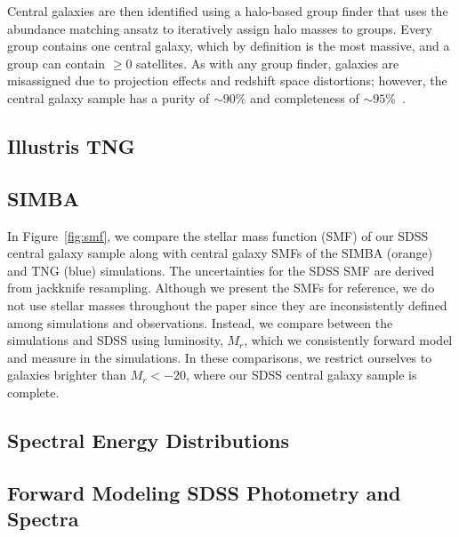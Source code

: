 Central galaxies are then identified using a halo-based group finder that uses
the abundance matching ansatz to iteratively  assign halo masses to groups.
Every group contains one central galaxy, which by definition is the most
massive, and a group can contain $\ge0$ satellites. As with any group finder,
galaxies are misassigned due to projection effects and redshift space
distortions; however, the central galaxy sample has a purity of ${\sim}90\%$
and completeness of ${\sim}95\%$~\citep{tinker2018}. 

\subsection{Illustris TNG} \label{sec:tng}

\subsection{SIMBA} \label{sec:simba}

In Figure~\ref{fig:smf}, we compare the stellar mass function (SMF) of our SDSS
central galaxy sample along with central galaxy SMFs of the SIMBA (orange) and
TNG (blue) simulations. The uncertainties for the SDSS SMF are derived from
jackknife resampling. Although we present the SMFs for reference, we do not use
stellar masses throughout the paper since they are inconsistently defined among
simulations and observations. Instead, we compare between the simulations and
SDSS using luminosity, $M_r$, which we consistently forward model and measure
in the simulations. In these comparisons, we restrict ourselves to galaxies
brighter than $M_r < -20$, where our SDSS central galaxy sample is complete. 

\subsection{Spectral Energy Distributions} \label{sec:sed}

\subsection{Forward Modeling SDSS Photometry and Spectra} \label{sec:fm} 



